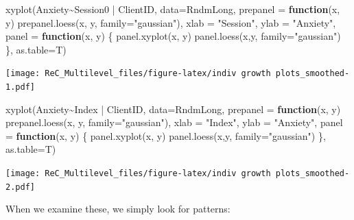 \documentclass[
  english,
]{book}
\newenvironment{Shaded}{\begin{snugshade}}{\end{snugshade}}
\newcommand{\AttributeTok}[1]{\textcolor[rgb]{0.77,0.63,0.00}{#1}}
\newcommand{\ControlFlowTok}[1]{\textcolor[rgb]{0.13,0.29,0.53}{\textbf{#1}}}
\newcommand{\FunctionTok}[1]{\textcolor[rgb]{0.00,0.00,0.00}{#1}}
\newcommand{\NormalTok}[1]{#1}
\newcommand{\SpecialCharTok}[1]{\textcolor[rgb]{0.00,0.00,0.00}{#1}}
\newcommand{\StringTok}[1]{\textcolor[rgb]{0.31,0.60,0.02}{#1}}
\begin{document}
\begin{Shaded}
\begin{Highlighting}[]
\FunctionTok{xyplot}\NormalTok{(Anxiety}\SpecialCharTok{\textasciitilde{}}\NormalTok{Session0 }\SpecialCharTok{|}\NormalTok{ ClientID, }\AttributeTok{data=}\NormalTok{RndmLong,}
  \AttributeTok{prepanel =} \ControlFlowTok{function}\NormalTok{(x, y) }\FunctionTok{prepanel.loess}\NormalTok{(x, y, }\AttributeTok{family=}\StringTok{"gaussian"}\NormalTok{),}
  \AttributeTok{xlab =} \StringTok{"Session"}\NormalTok{, }\AttributeTok{ylab =} \StringTok{"Anxiety"}\NormalTok{,}
  \AttributeTok{panel =} \ControlFlowTok{function}\NormalTok{(x, y) \{}
  \FunctionTok{panel.xyplot}\NormalTok{(x, y)}
  \FunctionTok{panel.loess}\NormalTok{(x,y, }\AttributeTok{family=}\StringTok{"gaussian"}\NormalTok{) \},}
   \AttributeTok{as.table=}\NormalTok{T)}
\end{Highlighting}
\end{Shaded}

\texttt{[image: ReC\_Multilevel\_files/figure-latex/indiv growth plots\_smoothed-1.pdf]}

\begin{Shaded}
\begin{Highlighting}[]
\FunctionTok{xyplot}\NormalTok{(Anxiety}\SpecialCharTok{\textasciitilde{}}\NormalTok{Index }\SpecialCharTok{|}\NormalTok{ ClientID, }\AttributeTok{data=}\NormalTok{RndmLong,}
  \AttributeTok{prepanel =} \ControlFlowTok{function}\NormalTok{(x, y) }\FunctionTok{prepanel.loess}\NormalTok{(x, y, }\AttributeTok{family=}\StringTok{"gaussian"}\NormalTok{),}
  \AttributeTok{xlab =} \StringTok{"Index"}\NormalTok{, }\AttributeTok{ylab =} \StringTok{"Anxiety"}\NormalTok{,}
  \AttributeTok{panel =} \ControlFlowTok{function}\NormalTok{(x, y) \{}
  \FunctionTok{panel.xyplot}\NormalTok{(x, y)}
  \FunctionTok{panel.loess}\NormalTok{(x,y, }\AttributeTok{family=}\StringTok{"gaussian"}\NormalTok{) \},}
   \AttributeTok{as.table=}\NormalTok{T)}
\end{Highlighting}
\end{Shaded}

\texttt{[image: ReC\_Multilevel\_files/figure-latex/indiv growth plots\_smoothed-2.pdf]}

When we examine these, we simply look for patterns:
\end{document}
